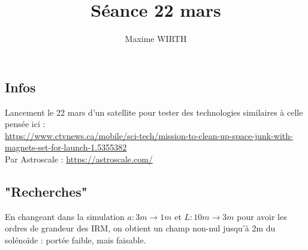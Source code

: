 \documentclass{article}
\author{Maxime WIRTH}
\title{Séance 22 mars}
\begin{document}
\maketitle

\subsection{Infos}

Lancement le 22 mars d'un satellite pour tester des technologies similaires à celle pensée ici :\\
\url{https://www.ctvnews.ca/mobile/sci-tech/mission-to-clean-up-space-junk-with-magnets-set-for-launch-1.5355382}\\
Par Astroscale : \url{https://astroscale.com/}

\subsection{"Recherches"}

En changeant dans la simulation $ a : 3m \rightarrow 1m $ et $ L : 10m \rightarrow 3m $ pour avoir les ordres de grandeur des IRM, on obtient
un champ non-nul jusqu'à 2m du solénoïde : portée faible, mais faisable.
\end{document}
